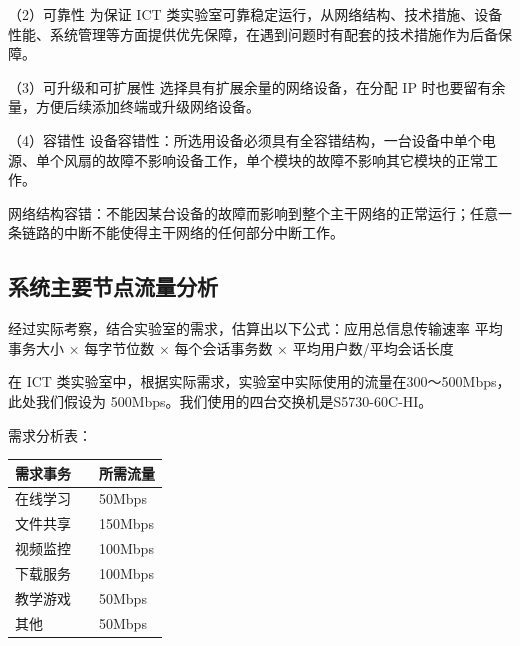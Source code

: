 \documentclass{imutthesis}
\begin{document}
（2）可靠性
为保证 ICT 类实验室可靠稳定运行，从网络结构、技术措施、设备性能、系统管理等方面提供优先保障，在遇到问题时有配套的技术措施作为后备保障。

（3）可升级和可扩展性
选择具有扩展余量的网络设备，在分配 IP 时也要留有余量，方便后续添加终端或升级网络设备。

（4）容错性
设备容错性：所选用设备必须具有全容错结构，一台设备中单个电源、单个风扇的故障不影响设备工作，单个模块的故障不影响其它模块的正常工作。

网络结构容错：不能因某台设备的故障而影响到整个主干网络的正常运行；任意一条链路的中断不能使得主干网络的任何部分中断工作。


\subsection{系统主要节点流量分析}
经过实际考察，结合实验室的需求，估算出以下公式：应用总信息传输速率 平均事务大小 × 每字节位数 × 每个会话事务数 × 平均用户数/平均会话长度

在 ICT 类实验室中，根据实际需求，实验室中实际使用的流量在300～500Mbps，此处我们假设为 500Mbps。我们使用的四台交换机是S5730-60C-HI。

需求分析表：
\begin{table}[h]%
    \centering
    \begin{tabular}{p{2.0cm}<{\centering}p{9.0cm}<{\centering}p{2.0cm}<{\centering}}
    \hline
    需求事务 & &所需流量  \\ %
    \hline
    在线学习 & & 50Mbps \\ 
    文件共享 & & 150Mbps \\ 
    视频监控 & & 100Mbps\\
    下载服务 & & 100Mbps\\
    教学游戏 & & 50Mbps\\
    其他 & & 50Mbps\\
    \hline
    \end{tabular}
\end{table}
\end{document}
